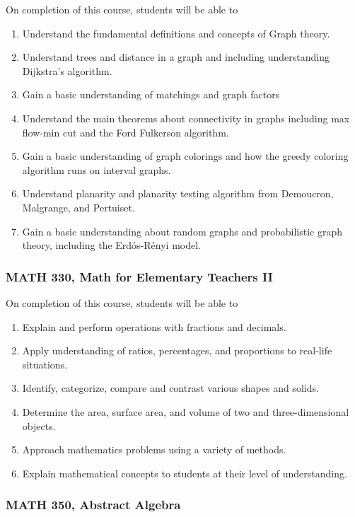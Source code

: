 \documentclass[11pt]{article}
\newenvironment{alphalist}{
\begin{enumerate}[label=(\arabic*),widest=107 ,leftmargin=25pt, itemsep=0pt]}
{\end{enumerate}}
\begin{document}
On completion of this course, students will be able to
\begin{alphalist}
    \item Understand the fundamental definitions and concepts of Graph theory.
    \item Understand trees and distance in a graph and including understanding Dijkstra's algorithm.
    \item Gain a basic understanding of matchings and graph factors
    \item Understand the main theorems about connectivity in graphs including 
    max  flow-min cut and the Ford Fulkerson algorithm.
    \item  Gain a basic understanding of graph colorings and how the 
    greedy coloring algorithm runs on interval graphs.
    \item Understand planarity and planarity testing algorithm from Demoucron, 
      Malgrange, and Pertuiset.
    \item  Gain a basic understanding about random graphs and probabilistic graph theory, including the Erd\'os-R\'enyi
       model.
\end{alphalist}

\subsubsection{MATH 330, Math for Elementary Teachers II}

On completion of this course, students will be able to
\begin{alphalist}
\item Explain and perform operations with fractions and decimals. 
\item Apply understanding of ratios, percentages, and proportions to real-life situations. 
\item Identify, categorize, compare and contrast various shapes and solids. 
\item Determine the area, surface area, and volume of two and three-dimensional objects. 
\item Approach mathematics problems using a variety of methods. 
\item Explain mathematical concepts to students at their level of understanding.
\end{alphalist}

\subsubsection{MATH 350,  Abstract Algebra}
\end{document}
